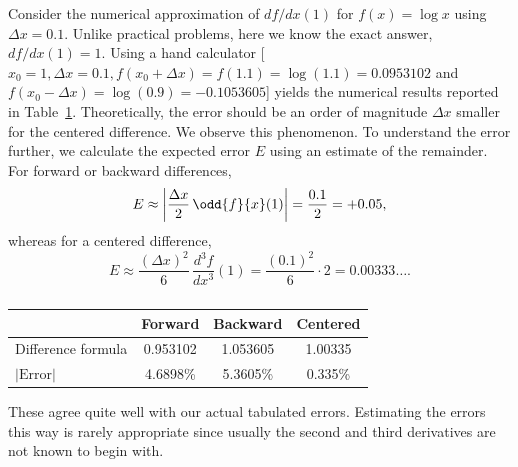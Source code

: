 \begin{example}
Consider the numerical approximation of $df/dx(1)$ for $f(x) = \log x$ using $\Delta x = 0.1$.  Unlike practical problems, here we know the exact answer, $df/dx(1) = 1$.  Using a hand calculator [$x_0 = 1, \Delta x = 0.1, f(x_0 + \Delta x) = f(1.1) = \log(1.1) = 0.0953102$ and $f(x_0 - \Delta x) = \log(0.9) = -0.1053605$] yields the numerical results reported in Table~\ref{tab:6.2.1}.  Theoretically, the error should be an order of magnitude $\Delta x$ smaller for the centered difference.  We observe this phenomenon.  To understand the error further, we calculate the expected error $E$ using an estimate of the remainder.  For forward or backward differences,
\[
E \approx \left|\frac{\Delta x}{2}\,\odd{f}{x}(1)\right| = \frac{0.1}{2} = +0.05,
\]
whereas for a centered difference,
\[
E \approx \frac{(\Delta x)^2}{6}\,\frac{d^3 f}{dx^3}(1) = \frac{(0.1)^2}{6}\cdot 2 = 0.00333\ldots.
\]

\begin{table}[H]
\centering
\caption{}
\label{tab:6.2.1}
\begin{tabular}{@{}lccc@{}}
\toprule
 & Forward & Backward & Centered \\
\midrule
Difference formula & 0.953102 & 1.053605 & 1.00335 \\
$|\text{Error}|$ & 4.6898\% & 5.3605\% & 0.335\% \\
\bottomrule
\end{tabular}
\end{table}
These agree quite well with our actual tabulated errors.  Estimating the errors this way is rarely appropriate since usually the second and third derivatives are not known to begin with.
\end{example}

